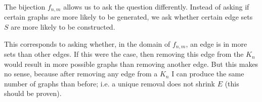 \documentclass[a4paper, 12pt]{article}
\begin{document}
The bijection $f_{n, m}$ allows us to ask the question differently. Instead of
asking if certain graphs are more likely to be generated, we ask whether
certain edge sets $S$ are more likely to be constructed. 

This corresponds to asking whether, in the domain of $f_{n,m}$, an edge is in
more sets than other edges. If this were the case, then removing this edge from
the $K_n$ would result in more possible graphs than removing another edge. But
this makes no sense, because after removing any edge from a $K_n$ I can produce
the same number of graphs than before; i.e. a unique removal does not shrink
$E$ (this should be proven).
\end{document}

